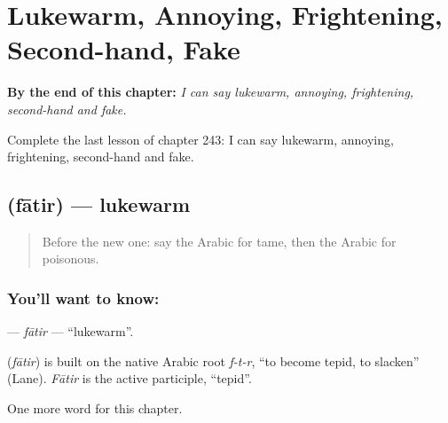 
\chapter{Lukewarm, Annoying, Frightening, Second-hand, Fake}
\label{ch:ar-lukewarm-annoying-frightening-second-hand-fake}

\begin{chapteropening}
\textbf{By the end of this chapter:} \emph{I can say lukewarm, annoying, frightening, second-hand and fake.}

Complete the last lesson of chapter 243: I can say lukewarm, annoying, frightening, second-hand and fake.
\end{chapteropening}

\section[\texorpdfstring{\ar{فاتر} (fātir)}{فاتر (fātir)}]{ (fātir) — lukewarm}

\label{lesson:AR-C243-fatir}



\begin{quote}
Before the new one: say the Arabic for tame, then the Arabic for poisonous.
\end{quote}

\subsection*{You'll want to know: }
\textbf{} — \emph{fātir} — \textquotedblleft{}lukewarm\textquotedblright{}.

\begin{cousinweb}
\textbf{} (\emph{fātir}) is built on the native Arabic root \emph{f-t-r}, \textquotedblleft{}to become tepid, to slacken\textquotedblright{} (Lane). \emph{Fātir} is the active participle, \textquotedblleft{}tepid\textquotedblright{}.
\end{cousinweb}

\begin{grammarlens}[title={What you've built}]
One more word for this chapter.
\end{grammarlens}

